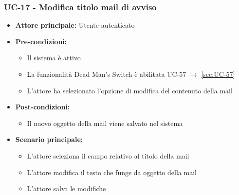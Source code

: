 \documentclass[a4paper,12pt]{article}
\begin{document}
\subsubsection{UC-17 - Modifica titolo mail di avviso} \label{sec:UC-17}
\begin{itemize}
    \item \textbf{Attore principale:} Utente autenticato
    \item \textbf{Pre-condizioni:}
    \begin{itemize}
        \item Il sistema è attivo
        \item La funzionalità Dead Man's Switch è abilitata UC-57 $\rightarrow$ \ref{sec:UC-57}
        \item L'attore ha selezionato l'opzione di modifica del contenuto della mail
    \end{itemize}
    \item \textbf{Post-condizioni:}
    \begin{itemize}
        \item Il nuovo oggetto della mail viene salvato nel sistema
    \end{itemize}
    \item \textbf{Scenario principale:} 
    \begin{itemize}
        \item L'attore seleziona il campo relativo al titolo della mail
        \item L'attore modifica il testo che funge da oggetto della mail
        \item L'attore salva le modifiche
    \end{itemize}
\end{itemize}
\end{document}
